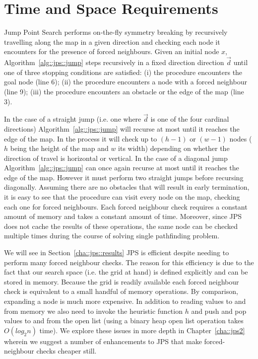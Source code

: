 \section{Time and Space Requirements}
\label{cha::jps::complexity}
Jump Point Search performs on-the-fly symmetry breaking by recursively travelling
along the map in a given direction and checking each node it encounters for the
presence of forced neighbours. 
Given an initial node $x$, Algorithm~\ref{alg::jps::jump} steps recursively in
a fixed direction direction $\vec{d}$ until one of three stopping conditions 
are satisfied: 
(i) the procedure encounters the goal node (line 6); 
(ii) the procedure encounters a node with a forced neighbour (line 9); 
(iii) the procedure encounters an obstacle or the edge of the map (line 3).  

In the case of a straight jump
(i.e. one where $\vec{d}$ is one of the four cardinal directions)
Algorithm~\ref{alg::jps::jump} will recurse at most until it reaches the edge of
the map. In the process it will check up to $(h-1)$ or $(w-1)$ nodes ($h$
being the height of the map and $w$ its width) 
depending on whether the direction of travel is horizontal or vertical.
In the case of a diagonal jump Algorithm~\ref{alg::jps::jump} can once again
recurse at most until it reaches the edge of the map. However it must perform two 
straight jumps before recursing diagonally. Assuming there are no obstacles that
will result in early termination, it is easy to see that the procedure can visit
every node on the map, checking each one for forced neighbours. 
Each forced neighbour check requires a constant amount of memory and takes a constant
amount of time. Moreover, since JPS does not cache the results of these operations, 
the same node can be checked multiple times during the course of solving single 
pathfinding problem. 

We will see in Section~\ref{cha::jps::results} JPS is efficient despite needing to
perform many forced neighbour checks. The reason for this efficiency is due to the 
fact that our search space (i.e. the grid at hand) is defined explicitly and can be 
stored in memory. Because the grid is readily available each forced neighbour check 
is equivalent to a small handful of memory operations. 
By comparison, expanding a node is much more expensive. In addition to reading
values to and from memory we also need to invoke the heuristic function $h$ and push 
and pop values to and from the open list (using a binary heap open list operation 
takes $O(log_2{n})$ time).
We explore these issues in more depth in Chapter~\ref{cha::jps2} wherein we suggest 
a number of enhancements to JPS that make forced-neighbour checks cheaper still.
